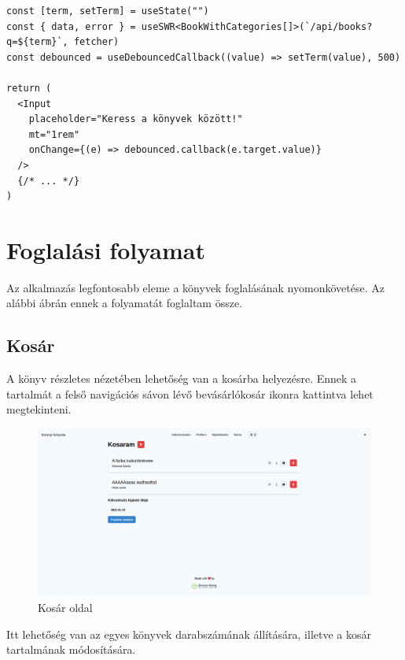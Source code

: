 \begin{lstlisting}[caption=A keresést megvalósító kódrészlet a frontenden]
const [term, setTerm] = useState("")
const { data, error } = useSWR<BookWithCategories[]>(`/api/books?q=${term}`, fetcher)
const debounced = useDebouncedCallback((value) => setTerm(value), 500)

return (
  <Input
    placeholder="Keress a könyvek között!"
    mt="1rem"
    onChange={(e) => debounced.callback(e.target.value)}
  />
  {/* ... */}
)
\end{lstlisting}

\section{Foglalási folyamat}

Az alkalmazás legfontosabb eleme a könyvek foglalásának nyomonkövetése. Az alábbi ábrán ennek a folyamatát foglaltam össze.


\subsection{Kosár}

A könyv részletes nézetében lehetőség van a kosárba helyezésre. Ennek a tartalmát a felső navigációs sávon lévő bevásárlókosár
ikonra kattintva lehet megtekinteni.

\begin{figure}[!ht]
  \centering
  \includegraphics[width=150mm, keepaspectratio]{figures/cart.png}
  \caption{Kosár oldal}
  \label{fig:CartPage}
\end{figure}

Itt lehetőség van az egyes könyvek darabszámának állítására, illetve a kosár tartalmának módosítására.

